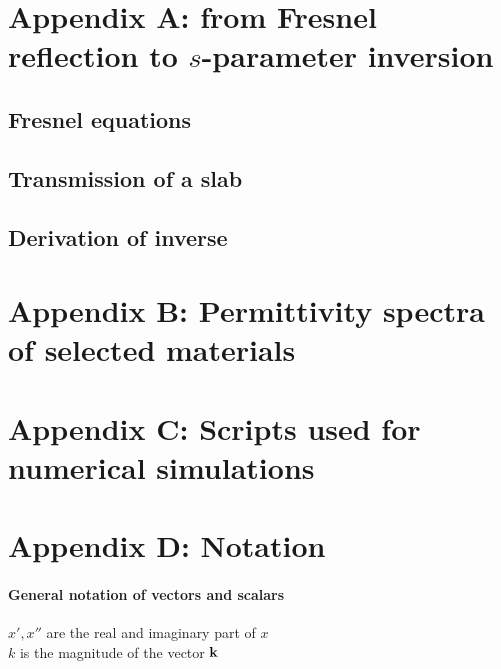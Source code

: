 \section{Appendix A: from Fresnel reflection to $s$-parameter inversion} \label{app_fresnel} %
\subsection{Fresnel equations} %
\subsection{Transmission of a slab} %
\subsection{Derivation of inverse }\label{app_fresnel_inv} %

\section{Appendix B: Permittivity spectra of selected materials} %

\section{Appendix C: Scripts used for numerical simulations} %

\section{Appendix D: Notation} %



\paragraph{General notation of vectors and scalars} %
$x', x''$ are the	real and imaginary part of $x$\\
$k$ 		is the magnitude of the vector ${\mathbf{k}}$\\

